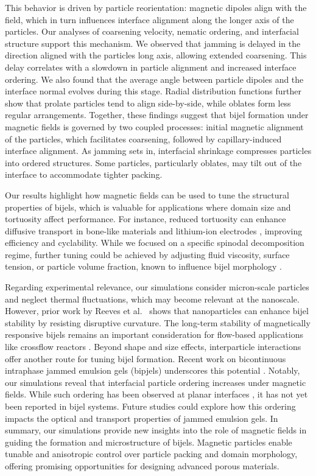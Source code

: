 This behavior is driven by particle reorientation: magnetic dipoles align with the field, which in turn influences interface alignment along the longer axis 
of the particles. Our analyses of coarsening velocity, nematic ordering, and interfacial structure support this mechanism. We observed that jamming is delayed 
in the direction aligned with the particles long axis, allowing extended coarsening. This delay correlates with a slowdown in particle alignment and increased 
interface ordering. We also found that the average angle between particle dipoles and the interface normal evolves during this stage. Radial distribution 
functions further show that prolate particles tend to align side-by-side, while oblates form less regular arrangements.
Together, these findings suggest that bijel formation under magnetic fields is governed by two coupled processes: initial magnetic alignment of the particles, 
which facilitates coarsening, followed by capillary-induced interface alignment. As jamming sets in, interfacial shrinkage compresses particles into ordered 
structures. Some particles, particularly oblates, may tilt out of the interface to accommodate tighter packing.

Our results highlight how magnetic fields can be used to tune the structural properties of bijels, which is valuable for applications where domain size and 
tortuosity affect performance. For instance, reduced tortuosity can enhance diffusive transport in bone-like materials \cite{prakoso2023tortuosity} and 
lithium-ion electrodes \cite{chen2020tortuosity, ebner2014tortuosity}, improving efficiency and cyclability. While we focused on a specific spinodal 
decomposition regime, further tuning could be achieved by adjusting fluid viscosity, surface tension, or particle volume fraction, known to influence 
bijel morphology \cite{jansen_bijels_2011, hijnen_bijels_2015}.

Regarding experimental relevance, our simulations consider micron-scale particles and neglect thermal fluctuations, which may become relevant at the 
nanoscale. However, prior work by Reeves et al.~\cite{reeves_particle-size_2015} shows that nanoparticles can enhance bijel stability by resisting 
disruptive curvature. The long-term stability of magnetically responsive bijels remains an important consideration for flow-based applications like 
crossflow reactors \cite{khan_nanostructured_2022}.
Beyond shape and size effects, interparticle interactions offer another route for tuning bijel formation. Recent work on bicontinuous intraphase jammed 
emulsion gels (bipjels) underscores this potential \cite{kinkead_bicontinuous_2019}. Notably, our simulations reveal that interfacial particle ordering 
increases under magnetic fields. While such ordering has been observed at planar interfaces 
\cite{toor_self-assembly_2016, shi_nanoparticle_2018, kim_dynamic_2022}, it has not yet been reported in bijel systems. Future studies could explore how 
this ordering impacts the optical and transport properties of jammed emulsion gels.
In summary, our simulations provide new insights into the role of magnetic fields in guiding the formation and microstructure of bijels. Magnetic particles 
enable tunable and anisotropic control over particle packing and domain morphology, offering promising opportunities for designing advanced porous materials.    
